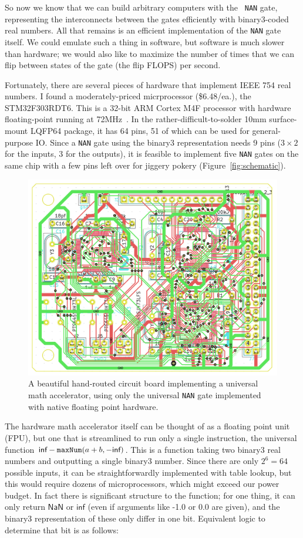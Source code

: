 \documentclass[twocolumn,cm]{article}
\newcommand\nan{\textsf{NaN}}
\renewcommand\inf{\textsf{inf}}
\begin{document}
So now we know that we can build arbitrary computers with the {\tt
  NAN} gate, representing the interconnects between the gates efficiently
with binary3-coded real numbers. All that remains is an efficient
implementation of the {\tt NAN} gate itself. We could emulate such
a thing in software, but software is much slower than hardware;
we would also like to maximize the number of times that we can flip
between states of the gate (the flip FLOPS) per second.

Fortunately, there are several pieces of hardware that implement
IEEE 754 real numbers. I found a moderately-priced micrprocessor
(\$6.48/ea.), the STM32F303RDT6. This is a 32-bit ARM Cortex M4F
processor with hardware floating-point running at 72MHz~\cite{stm32}.
In the rather-difficult-to-solder 10mm surface-mount LQFP64 package,
it has 64 pins, 51 of which can be used for general-purpose IO.
Since a {\tt NAN} gate using the binary3 representation needs 9
pins ($3 \times 2$ for the inputs, $3$ for the outputs), it is
feasible to implement five {\tt NAN} gates on the same chip with
a few pins left over for jiggery pokery (Figure~\ref{fig:schematic}).

\begin{figure}[t!]
  \begin{center}
    \includegraphics[width=0.55 \linewidth]{board}
  \end{center}\vspace{-0.1in}
  \caption{A beautiful hand-routed circuit board implementing a
    universal math accelerator, using only the universal {\tt NAN} gate
    implemented with native floating point hardware.}
  \label{fig:board}
\end{figure}

The hardware math accelerator itself can be thought of as a floating
point unit (FPU), but one that is streamlined to run only a single
instruction, the universal function $\inf - {\tt maxNum}(a + b, -\inf)$.
This is a function taking two binary3 real numbers and
outputting a single binary3 number. Since there are only $2^6 = 64$
possible inputs, it can be straightforwardly implemented with table
lookup, but this would require dozens of microprocessors, which
might exceed our power budget. In fact there is significant structure
to the function; for one thing, it can only return $\nan$ or $\inf$ (even
if arguments like -1.0 or 0.0 are given), and the
binary3 representation of these only differ in one bit. Equivalent
logic to determine that bit is as follows:
\end{document}
